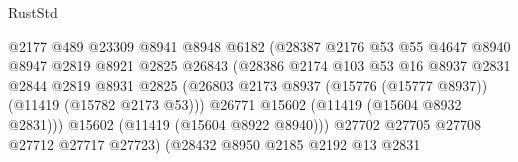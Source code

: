 \begin{lexlean}{RustStd}
\begin{coremodule}
                                          @2177
                                          @489
                                          @23309
                                          @8941
                                          @8948
                                          @6182
                                          (@28387
                                            @2176
                                            @53
                                            @55
                                            @4647
                                            @8940
                                            @8947
                                            @2819
                                            @8921
                                            @2825
                                            @26843
                                            (@28386
                                              @2174
                                              @103
                                              @53
                                              @16
                                              @8937
                                              @2831
                                              @2844
                                              @2819
                                              @8931
                                              @2825
                                              (@26803
                                                @2173
                                                @8937
                                                (@15776 (@15777 @8937))
                                                (@11419 (@15782 @2173 @53)))
                                              @26771
                                              @15602
                                              (@11419 (@15604 @8932 @2831)))
                                            @15602
                                            (@11419 (@15604 @8922 @8940)))
                                          @27702
                                          @27705
                                          @27708
                                          @27712
                                          @27717
                                          @27723)
                                        (@28432
                                          @8950
                                          @2185
                                          @2192
                                          @13
                                          @2831

\end{coremodule}
\end{lexlean}

